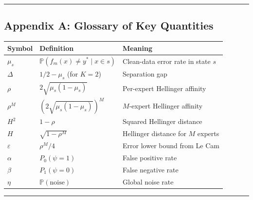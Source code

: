 \documentclass[
  12pt,
]{article}
\begin{document}
\begin{center}\rule{0.5\linewidth}{0.5pt}\end{center}

\subsection{Appendix A: Glossary of Key
Quantities}\label{appendix-a-glossary-of-key-quantities}

\begin{longtable}[]{@{}
  >{\raggedright\arraybackslash}p{}
  >{\raggedright\arraybackslash}p{}
  >{\raggedright\arraybackslash}p{}@{}}
\toprule\noalign{}
\begin{minipage}[b]{\linewidth}\raggedright
Symbol
\end{minipage} & \begin{minipage}[b]{\linewidth}\raggedright
Definition
\end{minipage} & \begin{minipage}[b]{\linewidth}\raggedright
Meaning
\end{minipage} \\
\midrule\noalign{}
\endhead
\bottomrule\noalign{}
\endlastfoot
\(\mu_s\) & \(\mathbb{P}(f_m(x) \neq y^* \mid x \in s)\) & Clean-data
error rate in state \(s\) \\
\(\Delta\) & \(1/2 - \mu_s\) (for \(K=2\)) & Separation gap \\
\(\rho\) & \(2\sqrt{\mu_s(1-\mu_s)}\) & Per-expert Hellinger affinity \\
\(\rho^M\) & \((2\sqrt{\mu_s(1-\mu_s)})^M\) & \(M\)-expert Hellinger
affinity \\
\(H^2\) & \(1 - \rho\) & Squared Hellinger distance \\
\(H\) & \(\sqrt{1-\rho^M}\) & Hellinger distance for \(M\) experts \\
\(\varepsilon\) & \(\rho^M/4\) & Error lower bound from Le Cam \\
\(\alpha\) & \(P_0(\psi=1)\) & False positive rate \\
\(\beta\) & \(P_1(\psi=0)\) & False negative rate \\
\(\eta\) & \(\mathbb{P}(\text{noise})\) & Global noise rate \\
\end{longtable}

\begin{center}\rule{0.5\linewidth}{0.5pt}\end{center}
\end{document}
